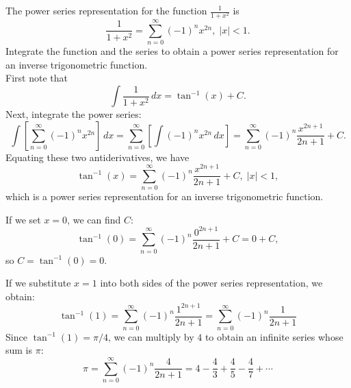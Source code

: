 \documentclass[handout]{ximera}
\begin{document}
\begin{example}[example 3]
The power series representation for the function $\frac{1}{1+x^2}$ is 
\[
\frac{1}{1+x^2} = \sum_{n=0}^\infty (-1)^n x^{2n}, \; |x| < 1.
\]
Integrate the function and the series to obtain a power series representation for an inverse trigonometric function.\\
First note that
\[
\int \frac{1}{1+x^2} \, dx = \tan^{-1}(x) + C.
\]
Next, integrate the power series:
\[
\int \left[\sum_{n=0}^\infty (-1)^n x^{2n} \right] \, dx =  \sum_{n=0}^\infty \left[ \int(-1)^n x^{2n} \, dx \right] = \sum_{n=0}^\infty  (-1)^n \frac{x^{2n+1}}{2n+1} +C.
\]
Equating these two antiderivatives, we have
\[
\tan^{-1}(x) = \sum_{n=0}^\infty  (-1)^n \frac{x^{2n+1}}{2n+1} +C, \; |x| < 1,
\]
which is a power series representation for an inverse trigonometric function.

\begin{remark}[Remark 1]
If we set $x = 0$, we can find $C$:
\[
\tan^{-1}(0) = \sum_{n=0}^\infty  (-1)^n \frac{0^{2n+1}}{2n+1} +C = 0 + C,
\]
so $C = \tan^{-1}(0) = 0$.
\end{remark}

\begin{remark}[Remark 2]
If we substitute $x = 1$ into both sides of the power series representation, we obtain:
\[
\tan^{-1}(1) = \sum_{n=0}^\infty  (-1)^n \frac{1^{2n+1}}{2n+1} = \sum_{n=0}^\infty  (-1)^n \frac{1}{2n+1} 
\]
Since $\tan^{-1}(1) = \pi/4$, we can multiply by $4$ to obtain an infinite series whose sum is $\pi$:
\[
\pi = \sum_{n=0}^\infty  (-1)^n \frac{4}{2n+1} = 4 - \frac43 + \frac45 - \frac47 + \cdots
\]
\end{remark}




\end{example}
\end{document}
